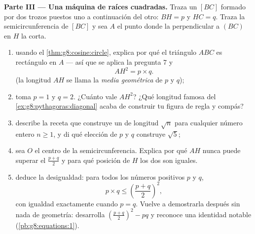\begin{problem}
\medskip
\noindent\textbf{Parte III --- Una máquina de raíces cuadradas.}
Traza un  $[BC]$ formado por dos trozos puestos uno a continuación del otro:
$BH = p$ y $HC = q$. Traza la semicircunferencia de  $[BC]$
y sea $A$ el punto donde la perpendicular a $(BC)$ en $H$
la corta.
\begin{enumerate}[resume]
  \item usando el \cref{thm:g8:cosine:circle}, explica por qué el
        triángulo $ABC$ es rectángulo en $A$ --- así que se aplica la pregunta 7
        y
        \[
        AH^2 = p \times q .
        \]
        (la longitud $AH$ se llama la \emph{media
        geométrica} de $p$ y $q$);
  \item toma $p = 1$ y $q = 2$. ¿Cuánto vale $AH^2$? ¿Qué longitud
        famosa del \cref{ex:g8:pythagoras:diagonal} acaba de construir tu
        figura de regla y compás?
  \item describe la receta que construye un  de longitud
        $\sqrt n$ para cualquier número entero $n \geq 1$, y di qué
        elección de $p$ y $q$ construye $\sqrt 5$;
  \item sea $O$ el centro de la semicircunferencia. Explica por qué
        $AH$ nunca puede superar el  $\frac{p + q}{2}$ y
        para qué posición de $H$ los dos son iguales.
  \item deduce la desigualdad: para todos los números positivos $p$ y
        $q$,
        \[
        p \times q \leq \left(\frac{p + q}{2}\right)^2,
        \]
        con igualdad exactamente cuando $p = q$. Vuelve a demostrarla después sin
        nada de geometría: desarrolla
        $\left(\frac{p+q}{2}\right)^2 - p q$ y reconoce una
        identidad notable (\cref{pb:g8:equations:1}).
\end{enumerate}
\end{problem}
